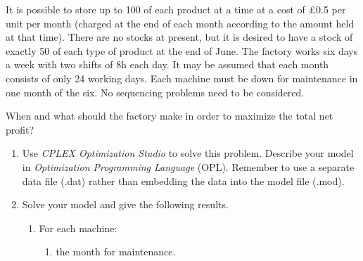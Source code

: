 \documentclass[12pt,a4paper]{article}
\theoremstyle{definition}
\begin{document}
\begin{enumerate}
    It is possible to store up to 100 of each product at a time at a cost of \pounds0.5 per unit per month (charged at the end of each month according to the amount held at that time). There are no stocks at present, but it is desired to have a stock of exactly 50 of each type of product at the end of June. The factory works six days a week with two shifts of 8h each day. It may be assumed that each month consists of only 24 working days. Each machine must be down for maintenance in one month of the six. No sequencing problems need to be considered.

    When and what should the factory make in order to maximize the total net profit?

    \begin{enumerate}
    \item
    Use \emph{CPLEX Optimization Studio} to solve this problem. Describe your model in \emph{Optimization Programming Language} (OPL). Remember to use a separate data file (.dat) rather than embedding the data into the model file (.mod).

      

    \item
    Solve your model and give the following results.
    \begin{enumerate}
    \item
    For each machine:
    \begin{enumerate}
    \item
    the month for maintenance.
    

\end{enumerate}
\end{enumerate}
\end{enumerate}
\end{enumerate}
\end{document}
